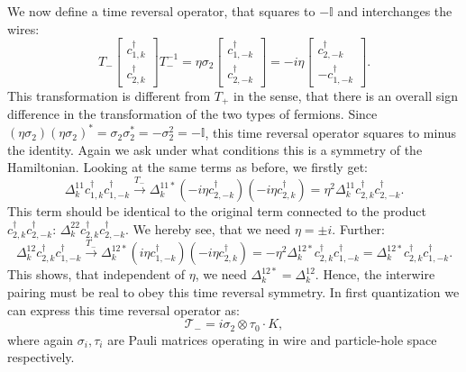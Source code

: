We now define a time reversal operator, that squares to $-\mathbb{I}$ and interchanges the wires:
\begin{equation}
T_-\begin{bmatrix} c^\dagger_{1,k} \\ c^\dagger_{2,k} \end{bmatrix} T_-^{-1} = \eta\sigma_2 \begin{bmatrix} c^\dagger_{1,-k} \\ c^\dagger_{2,-k} \end{bmatrix} = -i\eta\begin{bmatrix} c^\dagger_{2,-k} \\ - c^\dagger_{1,-k} \end{bmatrix}.\nonumber
\end{equation} 
This transformation is different from $T_+$ in the sense, that there is an overall sign difference in the transformation of the two types of fermions. Since $(\eta \sigma_2)(\eta \sigma_2)^* = \sigma_2\sigma_2^* = - \sigma_2^2 = - \mathbb{I}$, this time reversal operator squares to minus the identity. Again we ask under what conditions this is a symmetry of the Hamiltonian. Looking at the same terms as before, we firstly get:
\begin{equation}
\Delta^{11}_k c^\dagger_{1,k}c^\dagger_{1,-k} \overset{T_-}{\to} \Delta^{11*}_k \left(-i\eta c^\dagger_{2,-k}\right)\left(-i\eta c^\dagger_{2,k}\right) = \eta^2\Delta^{11}_k c^\dagger_{2,k}c^\dagger_{2,-k}. \nonumber
\end{equation}
This term should be identical to the original term connected to the product $c^\dagger_{2,k}c^\dagger_{2,-k}$: $\Delta^{22}_k c^\dagger_{2,k}c^\dagger_{2,-k}$. We hereby see, that we need $\eta = \pm i$. Further:
\begin{equation}
\Delta^{12}_k c^\dagger_{2,k}c^\dagger_{1,-k} \overset{T_-}{\to} \Delta^{12*}_k \left(i\eta c^\dagger_{1,-k}\right)\left(-i\eta c^\dagger_{2,k}\right) = -\eta^2 \Delta^{12*}_k c^\dagger_{2,k}c^\dagger_{1,-k} = \Delta^{12*}_k c^\dagger_{2,k}c^\dagger_{1,-k}. \nonumber
\end{equation}
This shows, that independent of $\eta$, we need $\Delta^{12*}_k = \Delta^{12}_k$. Hence, the interwire pairing must be real to obey this time reversal symmetry. In first quantization we can express this time reversal operator as:
\begin{equation}
\mathcal{T}_- = i\sigma_2\otimes\tau_0 \cdot K, 
\label{eq.2wiresTminuswireexchangefirstquantization}
\end{equation}
where again $\sigma_i, \tau_i$ are Pauli matrices operating in wire and particle-hole space respectively. 


